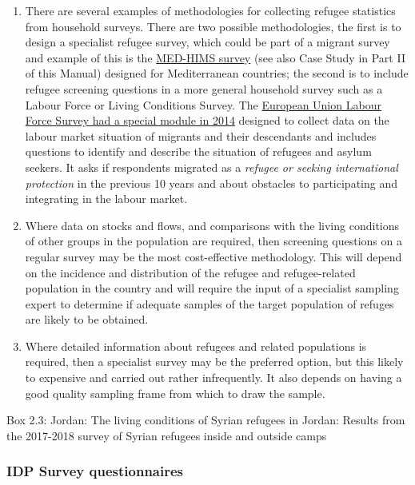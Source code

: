 \documentclass[
]{article}
\begin{document}
\begin{enumerate}
\def\labelenumi{\arabic{enumi}.}
\setcounter{enumi}{121}
\item
  There are several examples of methodologies for collecting refugee
  statistics from household surveys. There are two possible
  methodologies, the first is to design a specialist refugee survey,
  which could be part of a migrant survey and example of this is the
  \href{https://ec.europa.eu/eurostat/web/european-neighbourhood-policy/enp-south/med-hims}{MED-HIMS
  survey}
  (see also Case Study in Part II of this Manual) designed for
  Mediterranean countries; the second is to include refugee screening
  questions in a more general household survey such as a Labour Force
  or Living Conditions Survey. The \href{https://ec.europa.eu/eurostat/documents/1978984/6037334/Model-questionnaire-LFS-AHM-2014.pdf}{European Union Labour Force Survey
  had a special module in
  2014}
  designed to collect data on the labour market situation of migrants
  and their descendants and includes questions to identify and
  describe the situation of refugees and asylum seekers. It asks if
  respondents migrated as a \emph{refugee or seeking international
  protection} in the previous 10 years and about obstacles to
  participating and integrating in the labour market.
\item
  Where data on stocks and flows, and comparisons with the living
  conditions of other groups in the population are required, then
  screening questions on a regular survey may be the most
  cost-effective methodology. This will depend on the incidence and
  distribution of the refugee and refugee-related population in the
  country and will require the input of a specialist sampling expert
  to determine if adequate samples of the target population of refuges
  are likely to be obtained.
\item
  Where detailed information about refugees and related populations
  is required, then a specialist survey may be the preferred option,
  but this likely to expensive and carried out rather infrequently. It
  also depends on having a good quality sampling frame from which to
  draw the sample.
\end{enumerate}

Box 2.3: Jordan: The living conditions of Syrian refugees in Jordan:
Results from the 2017-2018 survey of Syrian refugees inside and outside
camps

\hypertarget{b.2.-idp-survey-questionnaires}{%
\subsubsection{IDP Survey questionnaires}\label{b.2.-idp-survey-questionnaires}}
\end{document}
